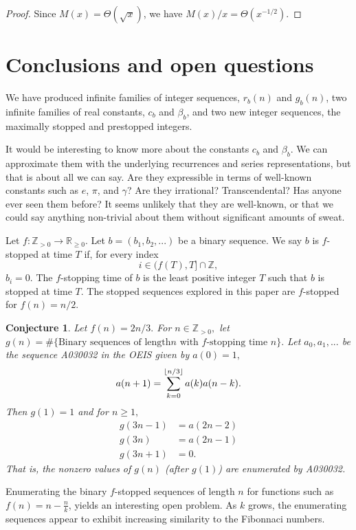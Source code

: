 \documentclass[12pt]{article}
\DeclarePairedDelimiter\floor{\lfloor}{\rfloor}
\newcommand{\Z}{\mathbb{Z}}
\newcommand{\R}{\mathbb{R}}
\newtheorem{conjecture}{Conjecture}
\theoremstyle{definition}
\begin{document}
\begin{proof}
    Since $M(x) = \Theta(\sqrt{x})$, we have $M(x) / x = \Theta(x^{-1/2})$.
\end{proof}

\section{Conclusions and open questions}
\label{sec:conclusion}

We have produced infinite families of integer sequences, $r_b(n)$ and $g_b(n)$,
two infinite families of real constants, $c_b$ and $\beta_b$, and two new
integer sequences, the maximally stopped and prestopped integers.

It would be interesting to know more about the constants $c_b$ and $\beta_b$.
We can approximate them with the underlying recurrences and series
representations, but that is about all we can say. Are they expressible in
terms of well-known constants such as $e$, $\pi$, and $\gamma$? Are they
irrational? Transcendental? Has anyone ever seen them before? It seems unlikely
that they are well-known, or that we could say anything non-trivial about them
without significant amounts of sweat.

Let $f : \Z_{>0} \to \R_{\geq 0}.$ 
Let $b = (b_1, b_2, ...)$ be a binary sequence. We say $b$ is $f$-stopped at time
$T$ if, for every index
$$i \in (f(T), T] \cap \Z,$$
$b_i = 0.$ The $f$-stopping time of $b$ is the least positive integer $T$ such that
$b$ is stopped at time $T.$ The stopped sequences explored in this paper are $f$-stopped for
$f(n) = n/2.$

\begin{conjecture}
    Let $f(n) = 2n/3.$
    For $n \in \Z_{>0},$ let $g(n) = \# \{\text{Binary sequences of length} n \text{ with } f\text{-stopping time } n\}.$
    Let $a_0, a_1, ...$ be the sequence \emph{A030032} in the OEIS given by $a(0) = 1,$
    $$a(n+1) = \sum_{k=0}^{\floor{n/3}} a(k) a(n-k).$$
    Then $g(1) = 1$ and for $n \geq 1,$
    \begin{align*}
        g(3n-1) &= a(2n-2) \\
        g(3n) &= a(2n-1) \\
        g(3n+1) &= 0.
    \end{align*}
    That is, the nonzero values of $g(n)$ (after $g(1)$) are enumerated by \emph{A030032}.
\end{conjecture}

Enumerating the binary $f$-stopped sequences of length $n$ for functions such as $f(n) = n - \frac{n}{k}$, yields an interesting open problem.
As $k$ grows, the enumerating sequences appear to exhibit increasing similarity to the Fibonnaci numbers.
\end{document}
